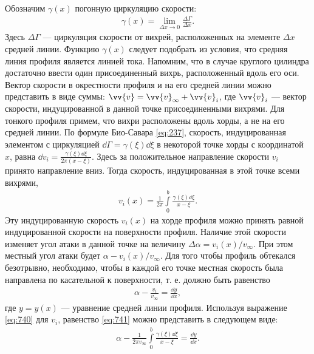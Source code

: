 	Обозначим $\gamma\left(x\right)$ погонную циркуляцию скорости:
	\begin{gather*}
		\gamma\left(x\right) = \lim_{\Delta x\to 0}\frac{\Delta\Gamma}{\Delta x}.
	\end{gather*}
	Здесь $\Delta\Gamma$ --- циркуляция скорости от вихрей, расположенных на элементе $\Delta x$ средней линии. Функцию $\gamma\left(x\right)$ следует подобрать из условия, что средняя линия профиля является линией тока. Напомним, что в случае круглого цилиндра достаточно ввести один присоединенный вихрь, расположенный вдоль его оси.\n
	Вектор скорости в окрестности профиля и на его средней линии можно представить в виде суммы: $\vv{v} = \vv{v}_\infty + \vv{v}_i$, где $\vv{v}_i$ --- вектор скорости, индуцированной в данной точке присоединенными вихрями. Для тонкого профиля примем, что вихри расположены вдоль хорды, а не на его средней линии. По формуле Био-Савара \eqref{eq:237}, скорость, индуцированная элементом с циркуляцией $\dd\Gamma = \gamma\left(\xi\right)\dd\xi$ в некоторой точке хорды с координатой $x$, равна $\dd v_i = \frac{\gamma\left(\xi\right)\dd\xi}{2\pi\left(x - \xi\right)}$. Здесь за положительное направление скорости $v_i$ принято направление вниз. Тогда скорость, индуцированная в этой точке всеми вихрями,
	\begin{gather}\label{eq:740}
		v_i\left(x\right) = \frac{1}{2\pi}\int\limits_0^b\frac{\gamma\left(\xi\right)\dd\xi}{x - \xi}.
	\end{gather}\n
	Эту индуцированную скорость $v_i\left(x\right)$ на хорде профиля можно принять равной индуцированной скорости на поверхности профиля. Наличие этой скорости изменяет угол атаки в данной точке на величину $\Delta\alpha = v_i\left(x\right)/v_\infty$. При этом местный угол атаки будет $\alpha - v_i\left(x\right)/v_\infty$.\n
	Для того чтобы профиль обтекался безотрывно, необходимо, чтобы в каждой его точке местная скорость была направлена по касательной к поверхности, т. е. должно быть равенство
	\begin{gather}\label{eq:741}
		\alpha - \frac{v_i}{v_\infty} = \frac{\dd y}{\dd x},
	\end{gather}
	где $y = y\left(x\right)$ --- уравнение средней линии профиля.\n
	Используя выражение \eqref{eq:740} для $v_i$, равенство \eqref{eq:741} можно представить в следующем виде:
	\begin{gather}\label{eq:742}
		\alpha - \frac{1}{2\pi v_\infty}\int\limits_0^b\frac{\gamma\left(\xi\right)\dd\xi}{x - \xi} = \frac{\dd y}{\dd x}.
	\end{gather}\n

